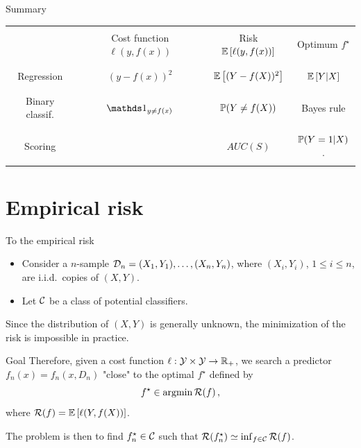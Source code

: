 \documentclass[xcolor={usenames,dvipsnames},handout]{beamer}
\begin{document}
\begin{frame}[shrink=20]{Summary}

\vspace{1.5cm}

\begin{tabularx}{\textwidth}{c||c|c|c}
& & & \\
 & Cost function $\ell(y,f(x))$ & Risk $\E \left[ \ell(y,f(x)) \right]$ & Optimum $f^\star$ \\
 & & & \\
 \hline 
 \hline
 & & & \\
 Regression & $(y-f(x))^2$ & $ \E \left[ (Y-f(X))^2 \right] $ & $\E\left[ Y |X\right]$ \\
 & & & \\
 \hline
 & & & \\
 Binary classif. & $\one_{y\neq f(x)}$ & $\P(Y\neq f(X))$ & Bayes rule \\
 & & & \\
 \hline
 & & & \\
 Scoring &   & $AUC(S)$ & $\P(Y=1 |X)$. \\
 & & & \\
\end{tabularx}
\vfill
\end{frame}


\section{Empirical risk}


\begin{frame}{To the empirical risk}

\begin{itemize}
\item Consider a $n$-sample $\Dc_n = (X_1,Y_1),\hdots, (X_n,Y_n)$, where $(X_i,Y_i)$, $1\leq i \leq n$, are i.i.d.\ copies of $(X,Y)$.
\item Let \alert{$\Cc$ be a class of potential classifiers}. 
\end{itemize}
Since the distribution of $(X,Y)$ is generally unknown, the minimization of the risk is impossible in practice.
\begin{block}{Goal}
Therefore, given a cost function $\ell : \Yc \times \Yc \to \R_+$, we search a predictor $f_n (x) = f_n(x, D_n)$ "close" to \alert{the optimal  $f^\star$} defined by
$$f^\star \in \argmin \Rc(f)\,,$$ 
where $\Rc(f) = \E \left[ \ell(Y , f (X ))\right]$.
\end{block}
The problem is then to find $f_n^\star\in \Cc$ such that $\Rc(f_n^\star) \simeq \inf_{f\in \Cc} \Rc(f)$.

\end{frame}
\end{document}
